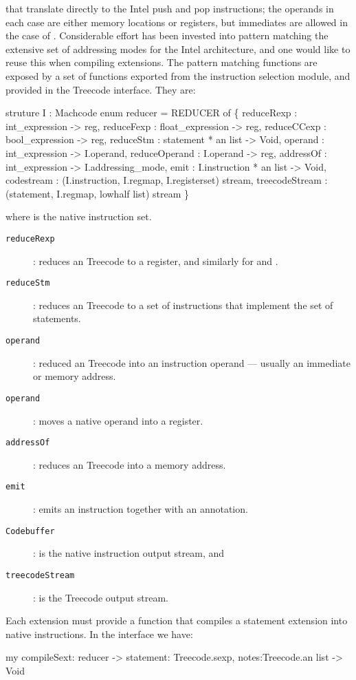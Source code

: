 that translate directly to the Intel push and pop instructions; the
operands in each case are either memory locations or registers, but
immediates are allowed in the case of . Considerable effort 
has been invested into pattern matching the extensive set of
addressing modes for the Intel architecture, and
one would like to reuse this when compiling extensions. The pattern
matching functions are exposed by a set of functions exported from the 
instruction selection module, and provided in the Treecode
interface. They are: 

\begin{SML}
  struture I : Machcode
  enum reducer = 
    REDUCER of \{
      reduceRexp    : int_expression -> reg,
      reduceFexp    : float_expression -> reg,
      reduceCCexp   : bool_expression -> reg,
      reduceStm     : statement * an list -> Void,
      operand       : int_expression -> I.operand,
      reduceOperand : I.operand -> reg,
      addressOf     : int_expression -> I.addressing_mode,
      emit          : I.instruction * an list -> Void,
      codestream   : (I.instruction, I.regmap, I.registerset) stream,
      treecodeStream  : (statement, I.regmap, lowhalf list) stream
    \}
\end{SML}

where  is the native instruction set. 
\begin{description}
\item[\tt reduceRexp]: reduces an Treecode  to a register, and
	similarly for  and .
\item[\tt reduceStm]: reduces an Treecode  to a set of instructions
	that implement the set of statements.
\item[\tt operand]: reduced an Treecode  into an instruction
operand --- usually an immediate or memory address.
\item[\tt operand]: moves a native operand into a register.
\item[\tt addressOf]: reduces an Treecode  into a memory address.
\item[\tt emit]: emits an instruction together with an annotation.
\item[\tt Codebuffer]: is the native instruction output stream, and
\item[\tt treecodeStream]: is the Treecode output stream.
\end{description}

Each extension must provide a function  that compiles
a statement extension into native instructions. In the
 interface we have:
\begin{SML}
  my compileSext: reducer -> {statement: Treecode.sexp, notes:Treecode.an list} -> Void
\end{SML}


